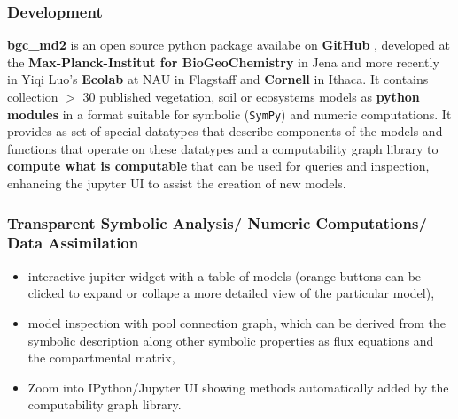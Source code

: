 \documentclass[36pt]{article}
\begin{document}
\begin{tcbposter}
{  \subsubsection*{Development}
	{ \bf bgc\_md2 } is an open source python package availabe on { \bf GitHub} , developed at the { \bf Max-Planck-Institut for BioGeoChemistry} in Jena and more recently  in Yiqi Luo's {\bf Ecolab} at NAU in Flagstaff and {\bf Cornell} in Ithaca.
	It contains collection $>$ 30 published vegetation, soil or ecosystems models as {\bf python modules}
  in a format suitable  for symbolic (\texttt{SymPy}) and numeric computations.
	It provides as set of special datatypes that describe components of the models and functions that operate on these datatypes
	and a computability graph library to {\bf compute what is computable} that can be used for queries and inspection,
  enhancing the jupyter UI to assist the creation of new models. 

\subsubsection*{Transparent Symbolic Analysis/ Numeric Computations/ Data Assimilation}
	  \begin{itemize}
	    \item 
      interactive jupiter widget with a table of models (orange buttons can be clicked to 
	    expand or collape a more detailed view of the particular model),
	    \item 
	    model inspection with pool connection graph, which can be derived from the symbolic description
	    along other symbolic properties as flux equations and the compartmental matrix,
	    \item 
      Zoom into IPython/Jupyter UI showing methods automatically added by the computability graph library. 
	    \end{itemize}
	  
}
\end{tcbposter}
\end{document}
